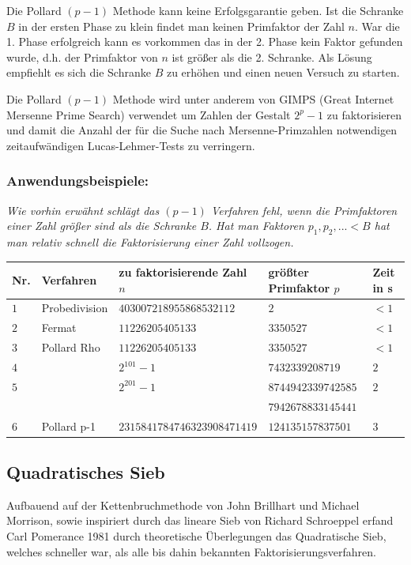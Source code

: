 \documentclass[10pt, bigheadings]{scrartcl}
\begin{document}
Die Pollard $(p-1)$ Methode kann keine Erfolgsgarantie geben. Ist die Schranke $B$
in der ersten Phase zu klein findet man keinen Primfaktor der Zahl $n$. War die
1. Phase erfolgreich kann es vorkommen das in der 2. Phase kein Faktor gefunden
wurde, d.h. der Primfaktor von $n$ ist größer als die 2. Schranke. Als Lösung
empfiehlt es sich die Schranke $B$ zu erhöhen und einen neuen Versuch zu
starten.

Die Pollard $(p-1)$ Methode wird unter anderem von GIMPS (Great Internet Mersenne Prime Search) verwendet
um Zahlen der Gestalt $2^p-1$ zu faktorisieren und damit die Anzahl der für die Suche
nach Mersenne-Primzahlen notwendigen zeitaufwändigen Lucas-Lehmer-Tests zu verringern.


\subsubsection*{Anwendungsbeispiele:}
{\it
Wie vorhin erwähnt schlägt das $(p-1)$ Verfahren fehl, wenn die Primfaktoren
einer Zahl größer sind als die Schranke $B$.
Hat man Faktoren $p_1, p_2,...<B$ hat man relativ schnell die Faktorisierung einer Zahl
vollzogen.
}
\begin{center}
\begin{tabular}{|l|l|l|l|l|}
\hline
Nr. & Verfahren & zu faktorisierende Zahl $n$ & größter Primfaktor $p$ & Zeit in s\\
\hline
$1$& Probedivision & $403007218955868532112$ & $2$ & $<1$\\
\hline
$2$& Fermat & $11226205405133$ & $3350527$ & $<1$\\
\hline
$3$ & Pollard Rho & $11226205405133$ & $3350527$ & $<1$\\
$4$& & $2^{101}-1$ & $7432339208719$ & $2$\\
$5$& & $2^{201}-1$ & $8744942339742585$ & $2$\\
   & &             & $7942678833145441$ & \\
$6$ & Pollard p-1 & $2315841784746323908471419$ & $124135157837501$ & $3$\\
\hline
\end{tabular}
\end{center}


\subsection{Quadratisches Sieb}
Aufbauend auf der Kettenbruchmethode von John Brillhart und Michael Morrison,
sowie inspiriert durch das lineare Sieb von Richard Schroeppel erfand Carl Pomerance
1981 durch theoretische Überlegungen das Quadratische Sieb, welches schneller war,
als alle bis dahin bekannten Faktorisierungsverfahren.
\end{document}
